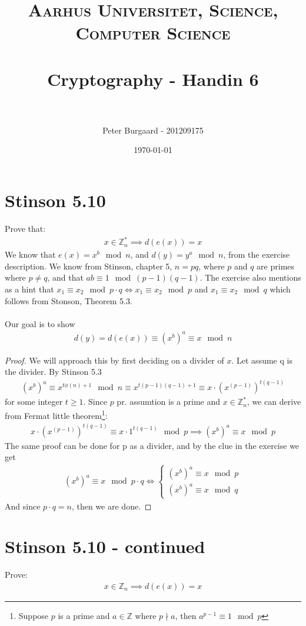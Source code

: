 \documentclass[paper=a4, fontsize=11pt]{scrartcl} %
\title{	
	\normalfont \normalsize 
	\textsc{Aarhus Universitet, Science, Computer Science} \\ [25pt] %
	\horrule{0.5pt} \\[0.4cm] %
	\huge Cryptography - Handin 6 \\ %
	\horrule{2pt} \\[0.5cm] %
}
\author{Peter Burgaard - 201209175} %
\date{\normalsize\today} %
\numberwithin{equation}{section} %
\numberwithin{figure}{section} %
\numberwithin{table}{section} %
\begin{document}
\maketitle

\section{Stinson 5.10}

Prove that:
\begin{align*}
	 x\in \mathbb{Z}_n^*\implies d(e(x))=x
\end{align*}
We know that $e(x)=x^b\mod{n}$, and $d(y)=y^a\mod{n}$, from the exercise description. We know from Stinson, chapter 5, $n=pq$, where $p$ and $q$ are primes where $p\neq q$, and that $ab\equiv1\mod{(p-1)(q-1)}$. The exercise also mentions as a hint that $x_1\equiv x_2\mod{p\cdot q} \iff x_1\equiv x_2\mod{p}$ and $x_1\equiv x_2\mod{q}$ which follows from Stonson, Theorem 5.3. \\ \\

Our goal is to show
\begin{align*}
	d(y)=d(e(x))\equiv \left( x^b\right) ^a\equiv x \mod{n}
\end{align*}
\begin{proof}
We will approach this by first deciding on a divider of $x$. Let assume q is the divider. By Stinson 5.3
\begin{align*}
	\left( x^b\right) ^a\equiv x^{t\phi(n)+1}\mod{n}\equiv x^{t(p-1)(q-1)+1}\equiv x\cdot \left( x^{(p-1)}\right) ^{t(q-1)}
\end{align*}
for some integer $t\geq1$. Since $p$ pr. assumtion is a prime and $x\in\mathbb{Z}_n^*$, we can derive from Fermat little theorem\footnote{Suppose $p$ is a prime and $a\in\mathbb{Z}$ where $p\nmid a$, then $a^{p-1}\equiv 1\mod{p}$}:
\begin{align*}
	x\cdot\left( x^{(p-1)}\right) ^{t(q-1)}\equiv x\cdot 1^{t(q-1)}\mod{p} \implies \left( x^b\right) ^a\equiv x \mod{p}
\end{align*}
The same proof can be done for  p as a divider, and by the clue in the exercise we get
\begin{align*}
\left( x^b\right) ^a\equiv x \mod{p\cdot q} \iff
\begin{cases}
\left( x^b\right) ^a\equiv x \mod{p} \\
\left( x^b\right) ^a\equiv x \mod{q} 
\end{cases} 
\end{align*}
And since $p\cdot q=n$, then we are done.
\end{proof}
\section{Stinson 5.10 - continued}
Prove:
\begin{align*}
	x \in \mathbb{Z}_n \implies d(e(x))=x
\end{align*}
\end{document}
